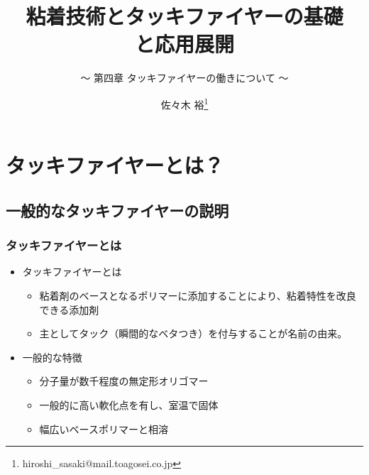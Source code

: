 \documentclass[12pt, dvipdfmx]{beamer}
\title{粘着技術とタッキファイヤーの基礎\\と応用展開}
\subtitle{ ～ 第四章 タッキファイヤーの働きについて ～}
\author[東亞合成 佐々木]{佐々木 裕\thanks{hiroshi\_sasaki@mail.toagosei.co.jp}}
\institute[東亞合成]{東亞合成株式会社}
\date{}
\begin{document}
\maketitle

\begin{frame} 
    \tableofcontents[]
\end{frame} 


\section{タッキファイヤーとは？}
\subsection{一般的なタッキファイヤーの説明}

\begin{frame}
	\frametitle{タッキファイヤーとは}
		\begin{itemize}
			\item タッキファイヤーとは
			\begin{itemize}
				\item 粘着剤のベースとなるポリマーに添加することにより、粘着特性を改良できる添加剤
				\item 主としてタック（瞬間的なベタつき）を付与することが名前の由来。
			\end{itemize}
			\item 一般的な特徴
			\begin{itemize}
				\item \alert{分子量が数千程度}の無定形オリゴマー
				\item 一般的に\alert{高い軟化点}を有し、室温で固体
				\item 幅広いベースポリマーと\alert{相溶}
			\end{itemize}
		\end{itemize}
\end{frame}
\end{document}

